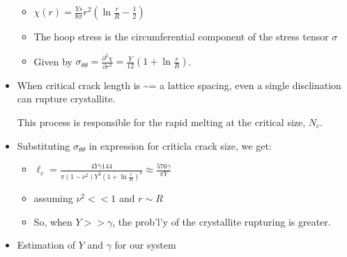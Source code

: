 \documentclass{umthesis}          %
\begin{document}
\begin{itemize}
\begin{itemize}
\item $\chi(r) =  \frac{Y s}{8 \pi} r^2   \left ( \ln \frac{r}{R} - \frac{1}{2} \right )$\\
\label{sec-3.1.5.4.3}


\item The hoop stress is the circumferential component of the stress tensor $\sigma$\\
\label{sec-3.1.5.4.4}


\item Given by $\sigma_{\theta \theta}= \frac{\partial^2 \chi}{\partial r^2}=  \frac{Y}{12} \left(1 + \ln \frac{r}{R} \right )$.\\
\label{sec-3.1.5.4.5}

\end{itemize} %

\item When critical crack length is \~{}= a lattice spacing, even a single disclination can rupture crystallite.\\
\label{sec-3.1.5.5}

This process is responsible for the rapid melting at the critical size, $N_c$.

\item Substituting  $\sigma_{\theta \theta}$ in expression for criticla crack size, we get:\\
\label{sec-3.1.5.6}

\begin{itemize}

\item $\ell_c = \frac{ 4 Y \gamma 144}{\pi (1-\nu^2) Y^2 (1+ \ln \frac{r}{R})^2} \approx \frac{576 \gamma}{\pi Y}$\\
\label{sec-3.1.5.6.1}


\item assuming $\nu^2 << 1$ and $r \sim R$\\
\label{sec-3.1.5.6.2}


\item So, when $Y >> \gamma$, the prob'l'y of the crystallite rupturing is greater.\\
\label{sec-3.1.5.6.3}

\end{itemize} %

\item Estimation of $Y$ and $\gamma$ for our system\\
\label{sec-3.1.5.7}

\begin{itemize}


\end{itemize}
\end{itemize}
\end{document}
